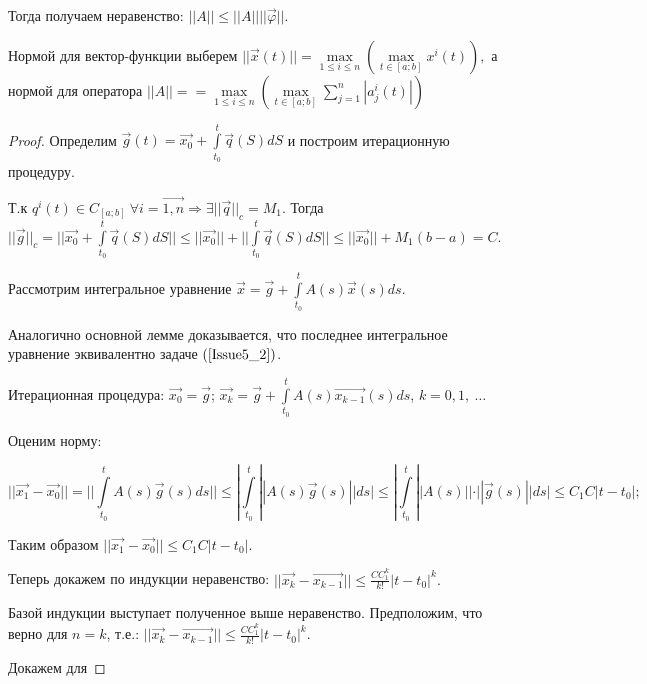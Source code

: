 Тогда получаем неравенство: $||A|| \leqslant ||A||||\overrightarrow{\varphi}||$.

Нормой для вектор-функции выберем $||\overrightarrow{x}(t)|| = \max\limits_{1 \leqslant i \leqslant n} (\max\limits_{t \in [a;b]} x^i(t)),$ а нормой для оператора $||A|| = = \max\limits_{1 \leqslant i \leqslant n} (\max\limits_{t \in [a;b]} \sum\limits_{j = 1}^{n} |a_j^i(t)|)$

\begin{proof}

Определим $\overrightarrow{g}(t) = \overrightarrow{x_0} + \int\limits_{t_0}^{t} \overrightarrow{q}(S)dS$ и построим итерационную процедуру.

Т.к $q^i(t) \in C_{[a;b]}\ \forall i = \overrightarrow{1,n} \Rightarrow \exists ||\overrightarrow{q}||_c = M_1.$ Тогда $||\overrightarrow{g}||_c = ||\overrightarrow{x_0} + \int\limits_{t_0}^{t}\overrightarrow{q}(S)dS|| \leqslant ||\overrightarrow{x_0}|| + ||\int\limits_{t_0}^{t}\overrightarrow{q}(S)dS|| \leqslant ||\overrightarrow{x_0}|| + M_1(b-a) = C.$

Рассмотрим интегральное уравнение $\overrightarrow{x} = \overrightarrow{g} + \int\limits_{t_0}^{t}A(s)\overrightarrow{x}(s)ds$.

Аналогично основной лемме доказывается, что последнее интегральное уравнение эквивалентно задаче $(\ref{Issue5_2})$.

Итерационная процедура: $\overrightarrow{x_0} = \overrightarrow{g}$; $\overrightarrow{x_k} = \overrightarrow{g} + \int\limits_{t_0}^{t} A(s)\overrightarrow{x_{k-1}}(s)ds $, $k = 0,1,\ \dots$

Оценим норму:

$$ ||\overrightarrow{x_1} - \overrightarrow{x_0}|| = || \int\limits_{t_0}^{t} A(s)\overrightarrow{g}(s)ds || \leqslant | \int\limits_{t_0}^{t} ||A(s)\overrightarrow{g}(s)||ds | \leqslant  | \int\limits_{t_0}^{t} ||A(s)||\cdot ||\overrightarrow{g}(s)||ds | \leqslant C_1 C |t - t_0|;$$ 

Таким образом $||\overrightarrow{x_1} -\overrightarrow{x_0}|| \leqslant C_1C|t-t_0|.$

Теперь докажем по индукции неравенство: $||\overrightarrow{x_k} - \overrightarrow{x_{k-1}}|| \leqslant \frac{CC_1^k}{k!}|t-t_0|^k.$

Базой индукции выступает полученное выше неравенство. Предположим, что верно для $n = k$, т.е.: $||\overrightarrow{x_k} - \overrightarrow{x_{k-1}}|| \leqslant \frac{CC_1^k}{k!}|t-t_0|^k.$

Докажем для 


\end{proof}
